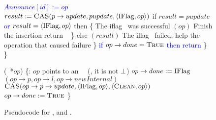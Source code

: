 \begin{figure*}
\begin{code}
		\textcolor{blue}{$Announce[id] := op$} \label{insert-write-announce} \nlc
		$result := \mbox{\sc CAS}(p\rightarrow update, pupdate, \langle \mbox{IFlag}, op\rangle)$ \label{iflag-cas} \nlc
		if $result = pupdate$ \textcolor{blue}{or $result = \langle \mbox{IFlag},op \rangle$} then \{ \tabtabcom The iflag \CASB\ was successful\nlc
		\n            {}$(op)$ \tabtabcom Finish the insertion\label{finish-insert}\nlc
		return \TRUE\ \label{insert-true}\nlc
		\p        \}\nlc 
		else $(result)$ \tabcom The iflag \CASB\ failed; help the operation that caused failure\label{ins-help-after-failure}\nlc
		\p    \}\nlc
		\textcolor{blue}{if $op \rightarrow done = \mbox{\sc True}$ then} \nlc
		\n		\textcolor{blue}{return \TRUE} \nlc \p
		\p\}\nlc 
		\p
		\}\bl
		\nlc
		
		(\IFlag\ *$op$) \{\ul
		\n     {}:  $op$ points to an \IFlag\ \record\  (\ie, it is not $\mbox{$\bot$}$)\nlc
		\textcolor{blue}{$op \rightarrow done := \mbox{IFlag}$} \nlc 
		$(op\rightarrow p, op\rightarrow l, op\rightarrow newInternal)$ \label{ichild-cas}\nlc
		$\mbox{\sc CAS}(op\rightarrow p\rightarrow update, \langle \mbox{IFlag}, op \rangle, \langle \mbox{\sc Clean}, op\rangle)$  \label{iunflag-cas}\nlc
		\textcolor{blue}{$op \rightarrow done := \mbox{\sc True}$} \nlc 
		\p
		\}
	\end{code}
	\caption{\label{code2}Pseudocode for ,  and .}
\end{figure*}

